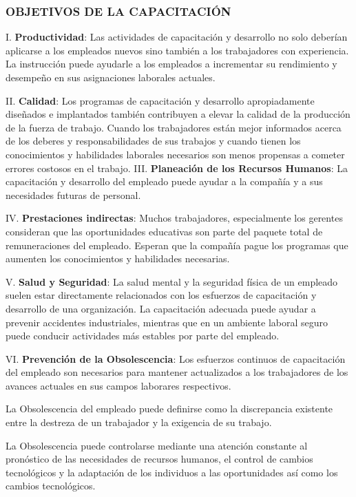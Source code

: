 \subsubsection*{OBJETIVOS DE LA CAPACITACIÓN}
I. \textbf{Productividad}: Las actividades de capacitación y desarrollo no solo deberían aplicarse a los empleados nuevos sino también a los trabajadores con experiencia. La instrucción puede ayudarle a los empleados a incrementar su rendimiento y desempeño en sus asignaciones laborales actuales.

II. \textbf{Calidad}: Los programas de capacitación y desarrollo apropiadamente diseñados e implantados también contribuyen a elevar la calidad de la producción de la fuerza de trabajo. Cuando los trabajadores están mejor informados acerca de los deberes y responsabilidades de sus trabajos y cuando tienen los conocimientos y habilidades laborales necesarios son menos propensas a cometer errores costosos en el trabajo. III. \textbf{Planeación de los Recursos Humanos}: La capacitación y desarrollo del empleado puede ayudar a la compañía y a sus necesidades futuras de personal.

IV. \textbf{Prestaciones indirectas}: Muchos trabajadores, especialmente los gerentes consideran que las oportunidades educativas son parte del paquete total de remuneraciones del empleado. Esperan que la compañía pague los programas que aumenten los conocimientos y habilidades necesarias.

V. \textbf{Salud y Seguridad}: La salud mental y la seguridad física de un empleado suelen estar directamente relacionados con los esfuerzos de capacitación y desarrollo de una organización. La capacitación adecuada puede ayudar a prevenir accidentes industriales, mientras que en un ambiente laboral seguro puede conducir actividades más estables por parte del empleado.

VI. \textbf{Prevención de la Obsolescencia}: Los esfuerzos continuos de capacitación del empleado son necesarios para mantener actualizados a los trabajadores de los avances actuales en sus campos laborares respectivos.

La Obsolescencia del empleado puede definirse como la discrepancia existente entre la destreza de un trabajador y la exigencia de su trabajo.

La Obsolescencia puede controlarse mediante una atención constante al pronóstico de las necesidades de recursos humanos, el control de cambios tecnológicos y la adaptación de los individuos a las oportunidades así como los cambios tecnológicos.

